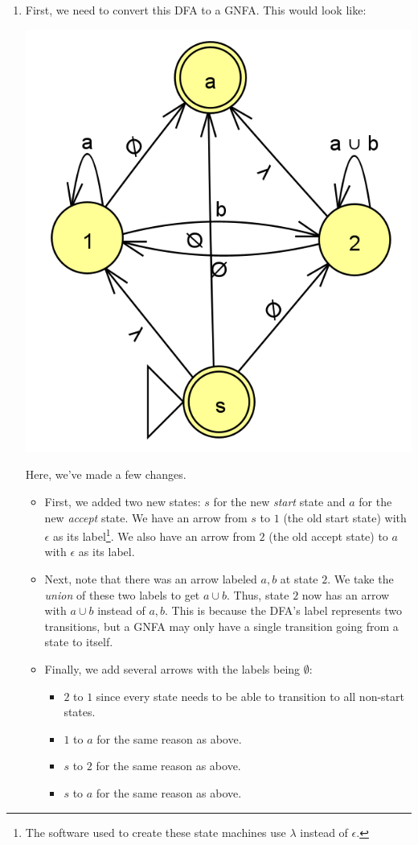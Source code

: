 \documentclass[letterpaper]{article}
\begin{document}
\begin{enumerate}
    \item First, we need to convert this DFA to a GNFA. This would look like: 
    \begin{center}
        \includegraphics[scale=0.4]{assets/dfa_regex_2.png}
    \end{center}
    Here, we've made a few changes. 
    \begin{itemize}
        \item First, we added two new states: $s$ for the new \emph{start} state and $a$ for the new \emph{accept} state. We have an arrow from $s$ to $1$ (the old start state) with $\epsilon$ as its label\footnote{The software used to create these state machines use $\lambda$ instead of $\epsilon$.}. We also have an arrow from $2$ (the old accept state) to $a$ with $\epsilon$ as its label. 
        \item Next, note that there was an arrow labeled $a, b$ at state $2$. We take the \emph{union} of these two labels to get $a \cup b$. Thus, state $2$ now has an arrow with $a \cup b$ instead of $a, b$. This is because the DFA's label represents two transitions, but a GNFA may only have a single transition going from a state to itself. 
        \item Finally, we add several arrows with the labels being $\emptyset$:
        \begin{itemize}
            \item $2$ to $1$ since every state needs to be able to transition to all non-start states. 
            \item $1$ to $a$ for the same reason as above. 
            \item $s$ to $2$ for the same reason as above. 
            \item $s$ to $a$ for the same reason as above. 
        \end{itemize}
    \end{itemize}


\end{enumerate}
\end{document}
